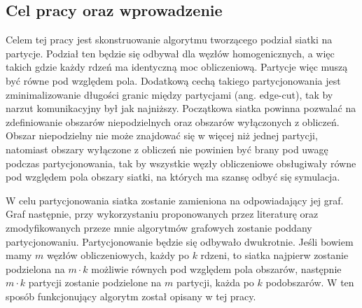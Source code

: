\subsection{Cel pracy oraz wprowadzenie}
Celem tej pracy jest skonstruowanie algorytmu tworzącego podział siatki na partycje.
Podział ten będzie się odbywał dla węzłów homogenicznych, a więc takich gdzie każdy rdzeń ma identyczną moc obliczeniową.
Partycje więc muszą być równe pod względem pola.
Dodatkową cechą takiego partycjonowania jest zminimalizowanie długości granic między partycjami (ang. edge-cut),
tak by narzut komunikacyjny był jak najniższy.
Początkowa siatka powinna pozwalać na zdefiniowanie obszarów niepodzielnych oraz obszarów wyłączonych z obliczeń.
Obszar niepodzielny nie może znajdować się w więcej niż jednej partycji, natomiast
obszary wyłączone z obliczeń nie powinien być brany pod uwagę podczas partycjonowania, tak by wszystkie węzły obliczeniowe
obsługiwały równe pod względem pola obszary siatki, na których ma szansę odbyć się symulacja.

W celu partycjonowania siatka zostanie zamieniona na odpowiadający jej graf.
Graf następnie, przy wykorzystaniu proponowanych przez literaturę oraz zmodyfikowanych przeze mnie algorytmów grafowych
zostanie poddany partycjonowaniu.
Partycjonowanie będzie się odbywało dwukrotnie.
Jeśli bowiem mamy $m$ węzłów obliczeniowych, każdy po $k$ rdzeni, to siatka najpierw zostanie podzielona na
$m \cdot k$ możliwie równych pod względem pola obszarów, następnie $m \cdot k$ partycji zostanie podzielone
na $m$ partycji, każda po $k$ podobszarów.
W ten sposób funkcjonujący algorytm został opisany w tej pracy.